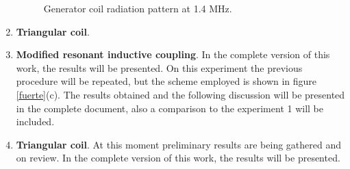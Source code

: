 \documentclass{intech}
\begin{document}
\begin{enumerate}
\begin{figure}[htbp]	%
\centering
{} %
\caption{Generator coil radiation pattern at 1.4 MHz.}
\label{datos1}
\end{figure}
\item {\bf Triangular coil}. 
\item  {\bf Modified resonant inductive coupling}. In the complete version of this work, the results will be presented.
On this experiment the previous procedure will be repeated, but the scheme employed is shown in figure \ref{fuerte}(c). The results obtained and the following discussion will be presented in the complete document, also a comparison to the experiment 1 will be included.
\item  {\bf Triangular coil}. At this moment preliminary results are being gathered and on review.  In the complete version of this work, the results will be presented.



\end{enumerate}
\end{document}
